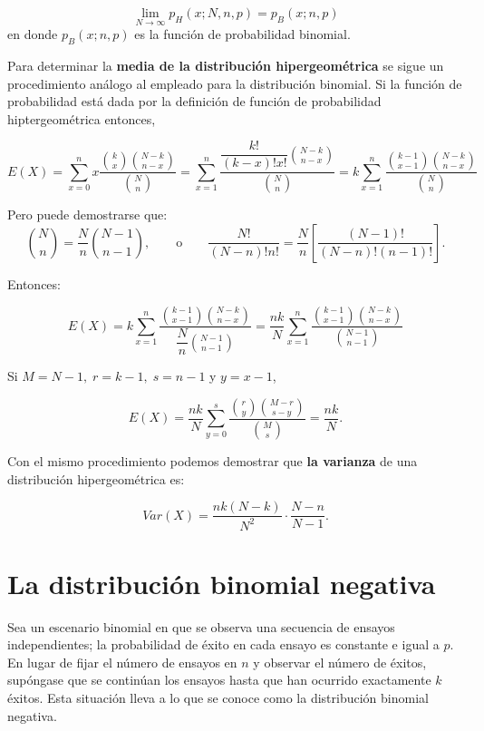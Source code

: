 \begin{tcolorbox}
    $$\lim_{N\to \infty} p_H(x;N,n,p) = p_B(x;n,p)$$
    en donde $p_B (x;n,p)$ es la función de probabilidad binomial.
\end{tcolorbox}

Para determinar la \textbf{media de la distribución hipergeométrica} se sigue un procedimiento análogo al empleado para la distribución binomial. Si la función de probabilidad está dada por la definición de función de probabilidad hiptergeométrica entonces,

    $$E(X)=\sum_{x= 0}^n x\dfrac{{k\choose x}{N-k\choose n-x}}{{N\choose n}} = \sum_{x=1}^n \dfrac{\dfrac{k!}{(k-x)!x!}{N-k\choose n-x}}{{N\choose n}}=k\sum_{x=1}^n \dfrac{{k-1\choose x-1}{N-k\choose n-x}}{{N\choose n}}$$

    Pero puede demostrarse que:
    $${N\choose n} = \dfrac{N}{n}{N-1\choose n-1}, \qquad \mbox{o}\qquad \dfrac{N!}{(N-n)!n!}=\dfrac{N}{n}\left[\dfrac{(N-1)!}{(N-n)!(n-1)!}\right].$$

    Entonces:

    $$E(X)=k\sum_{x=1}^n \dfrac{{k-1\choose x-1}{N-k\choose n-x}}{\dfrac{N}{n}{N-1\choose n-1}} = \dfrac{nk}{N}\sum_{x=1}^n \dfrac{{k-1\choose x-1}{N-k\choose n-x}}{{N-1\choose n-1}}$$

    Si $M=N-1,\; r=k-1,\; s=n-1$ y $y=x-1$,

    \begin{tcolorbox}
	$$E(X)=\dfrac{nk}{N} \sum_{y=0}^s \dfrac{{r\choose y}{M-r\choose s-y}}{{M\choose s}} = \dfrac{nk}{N}.$$
    \end{tcolorbox}

Con el mismo procedimiento podemos demostrar que \textbf{la varianza} de una distribución hipergeométrica es:

\begin{tcolorbox}
    $$Var(X)=\dfrac{nk(N-k)}{N^2}\cdot \dfrac{N-n}{N-1}.$$
\end{tcolorbox}

\section{La distribución binomial negativa}
Sea un escenario binomial en que se observa una secuencia de ensayos independientes; la probabilidad de éxito en cada ensayo es constante e igual a $p$. En lugar de fijar el número de ensayos en $n$ y observar el número de éxitos, supóngase que se continúan los ensayos hasta que han ocurrido exactamente $k$ éxitos. Esta situación lleva a lo que se conoce como la distribución binomial negativa.

